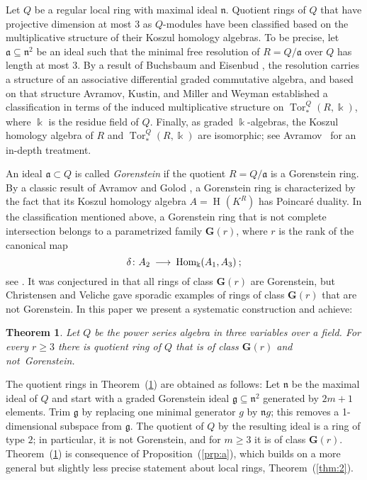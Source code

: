 \documentclass{amsart}
\theoremstyle{bfupright head,upright body}
\theoremstyle{fixed bf head,slanted body}
\newtheorem{thm}[res]{Theorem}          \newtheorem*{thm*}{Theorem}
\theoremstyle{fixed bf head,upright body}
\theoremstyle{numbered paragraph}
\newcommand{\pgref}[1]{(\ref{#1})}
\newcommand{\thmref}[2][Theorem~]{#1\pgref{thm:#2}}
\newcommand{\prpref}[2][Proposition~]{#1\pgref{prp:#2}}
\newcommand{\kk}{\Bbbk}
\newcommand{\n}{\mathfrak{n}}
\newcommand{\lra}{\longrightarrow}
\newcommand{\dmapdef}[4][\lra]{\nobreak{#2\colon #3\:#1\:#4}}
\renewcommand{\H}[2][]{\operatorname{H}_{#1}(#2)}
\newcommand{\Hom}[3][R]{\operatorname{Hom}_{#1}(#2,#3)}
\newcommand{\Tor}[4][R]{\operatorname{Tor}^{#1}_{#2}(#3,#4)}
\newcommand{\clG}[1]{\mathbf{G}(#1)}
\newcommand{\fa}{\mathfrak{a}}
\newcommand{\fg}{\mathfrak{g}}
\numberwithin{equation}{res}
\begin{document}
\noindent
Let $Q$ be a regular local ring with maximal ideal $\n$. Quotient
rings of $Q$ that have projective dimension at most $3$ as $Q$-modules
have been classified based on the multiplicative structure of their
Koszul homology algebras. To be precise, let $\fa \subseteq \n^2$ be
an ideal such that the minimal free resolution of $R=Q/\fa$ over $Q$
has length at most $3$. By a result of Buchsbaum and Eisenbud
\cite{DABDEs77}, the resolution carries a structure of an associative
differential graded commutative algebra, and based on that structure
Avramov, Kustin, and Miller \cite{AKM-88} and Weyman \cite{JWm89}
established a classification in terms of the induced multiplicative
structure on $\Tor[Q]{*}{R}{\kk}$, where $\kk$ is the residue field of
$Q$. Finally, as graded $\kk$-algebras, the Koszul homology algebra of
$R$ and $\Tor[Q]{*}{R}{\kk}$ are isomorphic; see Avramov~\cite{LLA12}
for an in-depth treatment.

An ideal $\fa \subset Q$ is called \emph{Gorenstein} if the quotient
$R=Q/\fa$ is a Gorenstein ring. By a classic result of Avramov and
Golod \cite{LLAESG71}, a Gorenstein ring is characterized by the fact
that its Koszul homology algebra $A=\H{K^R}$ has Poincar\'e
duality. In the classification mentioned above, a Gorenstein ring that
is not complete intersection belongs to a parametrized family
$\clG{r}$, where $r$ is the rank of the canonical map
\begin{equation*}
  \dmapdef{\delta}{A_2}{\Hom[\kk]{A_1}{A_3}}\:;
\end{equation*}
see \cite[1.4.2]{LLA12}. It was conjectured in \cite{LLA12} that all
rings of class $\clG{r}$ are Gorenstein, but Christensen and Veliche
\cite{LWCOVl14} gave sporadic examples of rings of class $\clG{r}$
that are not Gorenstein. In this paper we present a systematic
construction and achieve:

\begin{thm}
  \label{thm:a}
  Let $Q$ be the power series algebra in three variables over a
  field. For every $r \ge 3$ there is quotient ring of $Q$ that is of
  class $\clG{r}$ and not~Gorenstein.
\end{thm}

The quotient rings in \thmref{a} are obtained as follows: Let $\n$ be
the maximal ideal of $Q$ and start with a graded Gorenstein ideal $\fg
\subseteq \n^2$ generated by $2m+1$ elements.  Trim $\fg$ by replacing
one minimal generator $g$ by $\n g$; this removes a 1-dimensional
subspace from $\fg$. The quotient of $Q$ by the resulting ideal is a
ring of type $2$; in particular, it is not Gorenstein, and for $m \ge
3$ it is of class $\clG{r}$. \thmref{a} is consequence of \prpref{a},
which builds on a more general but slightly less precise statement
about local rings, \thmref{2}.
\end{document}
